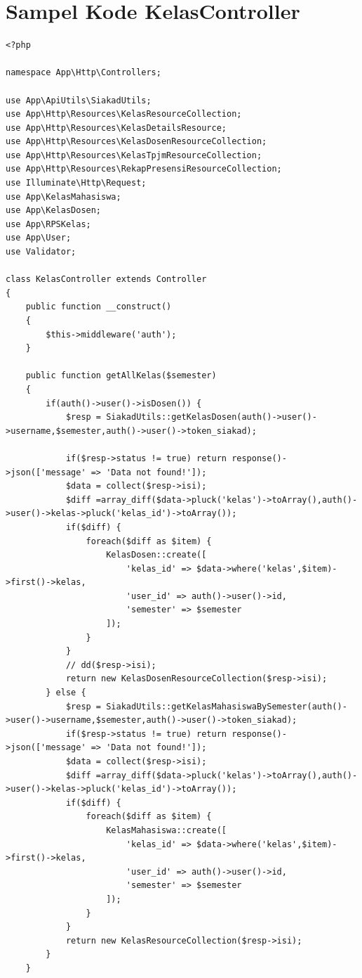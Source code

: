 \chapter{Sampel Kode KelasController}

\begin{lstlisting}[breaklines]
<?php

namespace App\Http\Controllers;

use App\ApiUtils\SiakadUtils;
use App\Http\Resources\KelasResourceCollection;
use App\Http\Resources\KelasDetailsResource;
use App\Http\Resources\KelasDosenResourceCollection;
use App\Http\Resources\KelasTpjmResourceCollection;
use App\Http\Resources\RekapPresensiResourceCollection;
use Illuminate\Http\Request;
use App\KelasMahasiswa;
use App\KelasDosen;
use App\RPSKelas;
use App\User;
use Validator;

class KelasController extends Controller
{
    public function __construct()
    {
        $this->middleware('auth');
    }

    public function getAllKelas($semester)
    {
        if(auth()->user()->isDosen()) {
            $resp = SiakadUtils::getKelasDosen(auth()->user()->username,$semester,auth()->user()->token_siakad);

            if($resp->status != true) return response()->json(['message' => 'Data not found!']);
            $data = collect($resp->isi);
            $diff =array_diff($data->pluck('kelas')->toArray(),auth()->user()->kelas->pluck('kelas_id')->toArray());
            if($diff) {
                foreach($diff as $item) {
                    KelasDosen::create([
                        'kelas_id' => $data->where('kelas',$item)->first()->kelas,
                        'user_id' => auth()->user()->id,
                        'semester' => $semester
                    ]);
                }
            }
            // dd($resp->isi);
            return new KelasDosenResourceCollection($resp->isi);
        } else {
            $resp = SiakadUtils::getKelasMahasiswaBySemester(auth()->user()->username,$semester,auth()->user()->token_siakad);
            if($resp->status != true) return response()->json(['message' => 'Data not found!']);
            $data = collect($resp->isi);
            $diff =array_diff($data->pluck('kelas')->toArray(),auth()->user()->kelas->pluck('kelas_id')->toArray());
            if($diff) {
                foreach($diff as $item) {
                    KelasMahasiswa::create([
                        'kelas_id' => $data->where('kelas',$item)->first()->kelas,
                        'user_id' => auth()->user()->id,
                        'semester' => $semester
                    ]);
                }
            }
            return new KelasResourceCollection($resp->isi);
        }
    }


\end{lstlisting}
